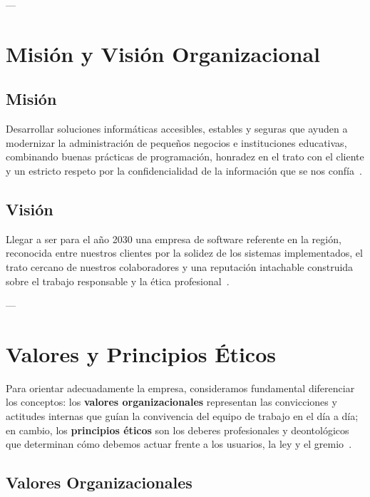 \documentclass[12pt,a4paper,oneside]{article}
\begin{document}
---

\section{Misión y Visión Organizacional}

\subsection{Misión}
Desarrollar soluciones informáticas accesibles, estables y seguras que ayuden a modernizar la administración de pequeños negocios e instituciones educativas, combinando buenas prácticas de programación, honradez en el trato con el cliente y un estricto respeto por la confidencialidad de la información que se nos confía~\cite{gotterbarn2001,sommerville2011}.

\subsection{Visión}
Llegar a ser para el año 2030 una empresa de software referente en la región, reconocida entre nuestros clientes por la solidez de los sistemas implementados, el trato cercano de nuestros colaboradores y una reputación intachable construida sobre el trabajo responsable y la ética profesional~\cite{acm2018}.

---

\section{Valores y Principios Éticos}

Para orientar adecuadamente la empresa, consideramos fundamental diferenciar los conceptos: los \textbf{valores organizacionales} representan las convicciones y actitudes internas que guían la convivencia del equipo de trabajo en el día a día; en cambio, los \textbf{principios éticos} son los deberes profesionales y deontológicos que determinan cómo debemos actuar frente a los usuarios, la ley y el gremio~\cite{acm2018,gotterbarn2001}.

\subsection{Valores Organizacionales}
\end{document}
